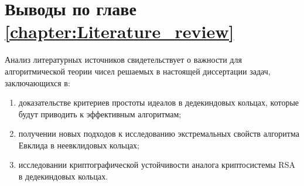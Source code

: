 \documentclass[_00_dissertation.tex]{subfiles}
\begin{document}
\section*{Выводы по главе \ref{chapter:Literature_review}}

Анализ литературных источников свидетельствует о важности для алгоритмической теории чисел решаемых в настоящей диссертации задач, заключающихся в:
\begin{enumerate}
    \item доказательстве критериев простоты идеалов в дедекиндовых кольцах, которые будут приводить к эффективным алгоритмам;

    \item получении новых подходов к исследованию экстремальных свойств алгоритма Евклида в неевклидовых кольцах;

    \item исследовании криптографической устойчивости аналога криптосистемы RSA в дедекиндовых кольцах.
\end{enumerate}

\onlyinsubfile{
    
}
\end{document}
